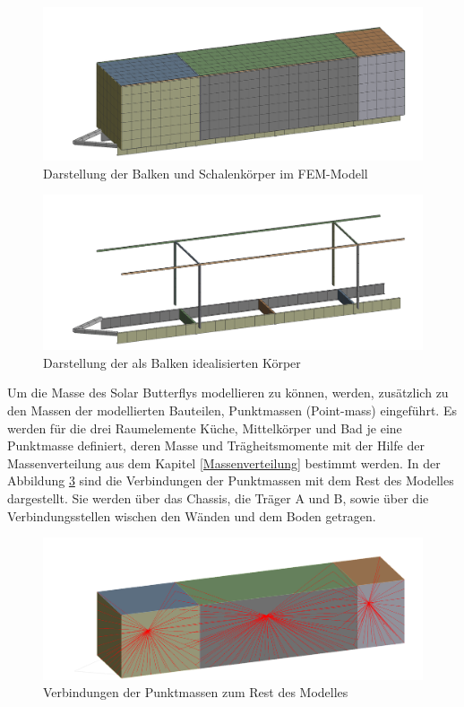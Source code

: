 \begin{figure}[H]
  \centering
  \centering
  \includegraphics[width=.7\linewidth]{04_figures/FEM Mesh1.png}
  \caption{Darstellung der Balken und Schalenkörper im FEM-Modell}
  \label{FEM Mesh1}
\end{figure}
\begin{figure}[H]
  \centering
  \includegraphics[width=.7\linewidth]{04_figures/FEM Mesh3.png}
  \caption{Darstellung der als Balken idealisierten Körper}
  \label{FEM Mesh3}
\end{figure}

Um die Masse des Solar Butterflys modellieren zu können, werden, zusätzlich zu den Massen der modellierten Bauteilen, Punktmassen (Point-mass) eingeführt. Es werden für die drei Raumelemente Küche, Mittelkörper und Bad je eine Punktmasse definiert, deren Masse und Trägheitsmomente mit der Hilfe der Massenverteilung aus dem Kapitel \ref{Massenverteilung} bestimmt werden. In der Abbildung \ref{img:FEM Punktmasse} sind die Verbindungen der Punktmassen mit dem Rest des Modelles dargestellt. Sie werden über das Chassis, die Träger A und B, sowie über die Verbindungsstellen wischen den Wänden und dem Boden getragen.\\
\begin{figure}[h]
  \centering
  \includegraphics[width=0.7\linewidth]{04_Figures/FEM Punktmasse.png}
  \caption{Verbindungen der Punktmassen zum Rest des Modelles}
  \label{img:FEM Punktmasse}
\end{figure}

